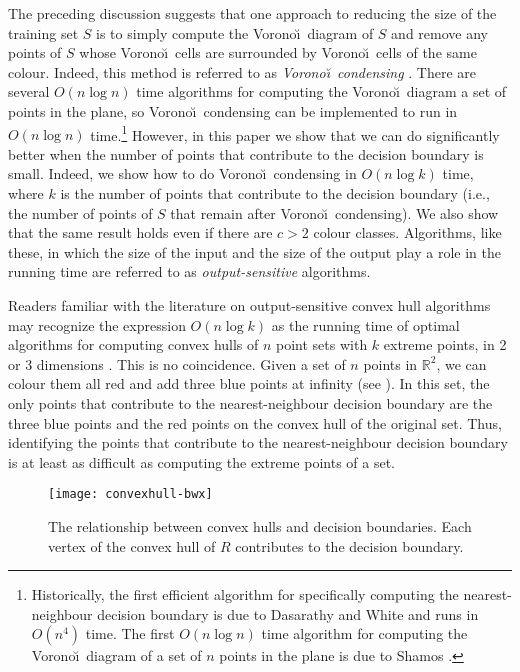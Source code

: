 \documentclass[lotsofwhite,charterfonts]{patmorin}
\newcommand{\voronoi}{Vorono\u\i}
\begin{document}
The preceding discussion suggests that one approach to reducing the
size of the training set $S$ is to simply compute the \voronoi\
diagram of $S$ and remove any points of $S$ whose \voronoi\ cells are
surrounded by \voronoi\ cells of the same colour.  Indeed, this method
is referred to as \emph{\voronoi\ condensing} \cite{tbp84}.  There are
several $O(n\log n)$ time algorithms for computing the \voronoi\
diagram a set of points in the plane, so \voronoi\ condensing can be
implemented to run in $O(n\log n)$ time.\footnote{Historically, the
first efficient algorithm for specifically computing the
nearest-neighbour decision boundary is due to Dasarathy and White
\cite{dw78} and runs in $O(n^4)$ time.  The first $O(n\log n)$ time
algorithm for computing the \voronoi\ diagram of a set of $n$ points
in the plane is due to Shamos \cite{s75}.}  However, in this paper we
show that we can do significantly better when the number of points
that contribute to the decision boundary is small.  Indeed, we show
how to do \voronoi\ condensing in $O(n\log k)$ time, where $k$ is the
number of points that contribute to the decision boundary (i.e., the
number of points of $S$ that remain after \voronoi\ condensing).  We
also show that the same result holds even if there are $c>2$ colour
classes.
Algorithms, like these, in which the size of the input and
the size of the output play a role in the running time are referred to
as \emph{output-sensitive} algorithms. 

Readers familiar with the literature on output-sensitive convex hull
algorithms may recognize the expression $O(n\log k)$ as the running
time of optimal algorithms for computing convex hulls of $n$ point
sets with $k$ extreme points, in 2 or 3 dimensions
\cite{bs97,c96,csy97,ks86,w97}. This is no coincidence.  Given a set
of $n$ points in $\mathbb{R}^2$, we can colour them all red and add
three blue points at infinity (see \figref{convexhull}).  In this set,
the only points that contribute to the nearest-neighbour decision
boundary are the three blue points and the red points on the convex
hull of the original set.  Thus, identifying the points that
contribute to the nearest-neighbour decision boundary is at least as
difficult as computing the extreme points of a set.

\begin{figure}
\centerline{\texttt{[image: convexhull-bwx]}}
\caption{The relationship between convex hulls and decision
boundaries. Each vertex of the convex hull of $R$ contributes 
to the decision boundary.}
\figlabel{convexhull}
\end{figure}
\end{document}
